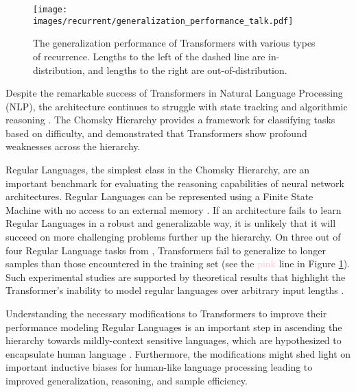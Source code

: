     \begin{figure}[t]
        \centering
        \texttt{[image: images/recurrent/generalization\_performance\_talk.pdf]}
        \caption{The generalization performance of Transformers with various types of recurrence. Lengths to the left of the dashed line are in-distribution, and lengths to the right are out-of-distribution.}
        \label{fig:results-summary}
    \end{figure}
    
    Despite the remarkable success of Transformers \citep{vaswani2017attention} in Natural Language Processing (NLP), the architecture continues to struggle with state tracking and algorithmic reasoning \citep{hahn_theoretical_2020, bhattamishra_ability_2020, deletang_neural_2022}. The Chomsky Hierarchy \citep{chomsky_three_1956, chomsky_certain_1959} provides a framework for classifying tasks based on difficulty, and \citet{deletang_neural_2022} demonstrated that Transformers show profound weaknesses across the hierarchy.
    
    Regular Languages, the simplest class in the Chomsky Hierarchy, are an important benchmark for evaluating the reasoning capabilities of neural network architectures. Regular Languages can be represented using a Finite State Machine with no access to an external memory \citep{hopcroft_introduction_2006}. If an architecture fails to learn Regular Languages in a robust and generalizable way, it is unlikely that it will succeed on more challenging problems further up the hierarchy. On three out of four Regular Language tasks from \citet{deletang_neural_2022}, Transformers fail to generalize to longer samples than those encountered in the training set (see the \textcolor{pink}{pink} line in Figure \ref{fig:results-summary}). Such experimental studies are supported by theoretical results that highlight the Transformer's inability to model regular languages over arbitrary input lengths \citep{merrill_parallelism_2023, strobl_what_2024}.
    
    Understanding the necessary modifications to Transformers to improve their performance modeling Regular Languages is an important step in ascending the hierarchy towards mildly-context sensitive languages, which are hypothesized to encapsulate human language \citep{joshi_tree_1985, joshi_convergence_1990}. Furthermore, the modifications might shed light on important inductive biases for human-like language processing leading to improved generalization, reasoning, and sample efficiency.
    
